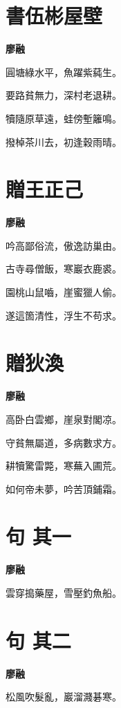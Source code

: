 \documentclass[12pt,a4paper]{ctexbook}
\begin{document}
\section{書伍彬屋壁}
\textbf{廖融}\par\vspace{0.5em}
圓塘綠水平，魚躍紫蒓生。\par
要路貧無力，深村老退耕。\par
犢隨原草遠，蛙傍塹籬鳴。\par
撥棹茶川去，初逢穀雨晴。\par

\section{贈王正己}
\textbf{廖融}\par\vspace{0.5em}
吟高鄙俗流，傲逸訪巢由。\par
古寺尋僧飯，寒巖衣鹿裘。\par
園桃山鼠嚙，崖蜜獵人偷。\par
遂這箇清性，浮生不苟求。\par

\section{贈狄渙}
\textbf{廖融}\par\vspace{0.5em}
高卧白雲鄉，崖泉對閣凉。\par
守貧無屬道，多病數求方。\par
耕犢驚雷斃，寒蕪入圃荒。\par
如何帝未夢，吟苦頂鋪霜。\par

\section{句  其一}
\textbf{廖融}\par\vspace{0.5em}
雲穿搗藥屋，雪壓釣魚船。\par

\section{句  其二}
\textbf{廖融}\par\vspace{0.5em}
松風吹髮亂，巖溜濺碁寒。\par
\end{document}

